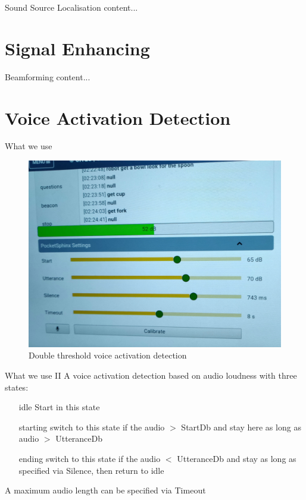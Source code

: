\documentclass{beamer}
\begin{document}
	\begin{frame}{Sound Source Localisation}
		content...
	\end{frame}
	
	\section{Signal Enhancing}%
	
	\begin{frame}{Beamforming}
		content...
	\end{frame}
	
	\section{Voice Activation Detection}%
	
	\begin{frame}{What we use}
		\begin{figure}[ht]
			\centering
			\includegraphics[width=.8\linewidth]{Bilder/VAD.jpg}
			\caption{Double threshold voice activation detection}
		\end{figure}
	\end{frame}
	
	\begin{frame}{What we use II}
		A voice activation detection based on audio loudness with three states: 
		\begin{itemize}
			\item[idle] Start in this state
			\item[starting] switch to this state if the audio $>$ StartDb and stay here as long as audio $>$ UtteranceDb
			\item[ending] switch to this state if the audio $<$ UtteranceDb and stay as long as specified via Silence, then return to idle
		\end{itemize}
		A maximum audio length can be specified via Timeout
	\end{frame}
	
\end{document}
